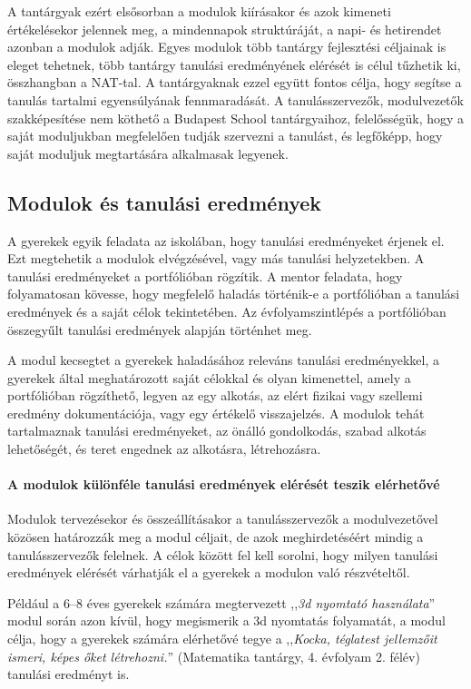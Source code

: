 A tantárgyak ezért elsősorban a modulok kiírásakor és azok kimeneti értékelésekor jelennek meg, a mindennapok struktúráját, a napi- és hetirendet azonban a modulok adják. Egyes modulok több tantárgy fejlesztési céljainak is eleget tehetnek, több tantárgy tanulási eredményének elérését is célul tűzhetik ki, összhangban a NAT-tal. A tantárgyaknak ezzel együtt fontos célja, hogy segítse a tanulás tartalmi egyensúlyának fennmaradását. A tanulásszervezők, modulvezetők szakképesítése nem köthető a Budapest School tantárgyaihoz, felelősségük, hogy a saját moduljukban megfelelően tudják szervezni a tanulást, és legfőképp, hogy saját moduljuk megtartására alkalmasak legyenek.

\subsection{Modulok és tanulási eredmények}
\label{sec:modulok_es_tanulasi_eredmenyek}
A gyerekek egyik feladata az iskolában, hogy tanulási eredményeket érjenek el. Ezt megtehetik a modulok elvégzésével, vagy más tanulási helyzetekben. A tanulási eredményeket a portfólióban rögzítik. A mentor feladata, hogy folyamatosan kövesse, hogy megfelelő haladás történik-e a portfólióban a tanulási eredmények és a saját célok tekintetében. Az évfolyamszintlépés a portfólióban összegyűlt tanulási eredmények alapján történhet meg.

A modul kecsegtet a gyerekek haladásához releváns tanulási eredményekkel, a gyerekek által meghatározott saját célokkal és olyan kimenettel, amely a portfólióban rögzíthető, legyen az egy alkotás, az elért fizikai vagy szellemi eredmény dokumentációja, vagy egy értékelő visszajelzés. A modulok tehát tartalmaznak tanulási eredményeket, az önálló gondolkodás, szabad alkotás lehetőségét, és teret engednek az alkotásra, létrehozásra.

\paragraph{A modulok különféle tanulási eredmények elérését teszik
  elérhetővé}\hfil\break
Modulok tervezésekor és összeállításakor a tanulásszervezők a modulvezetővel közösen határozzák meg a modul céljait, de azok meghirdetéséért mindig a tanulásszervezők felelnek. A célok között fel kell sorolni, hogy milyen tanulási eredmények elérését várhatják el a gyerekek a modulon való részvételtől.

Például a 6--8 éves gyerekek számára megtervezett ,,\emph{3d nyomtató használata}'' modul során azon kívül, hogy megismerik a 3d nyomtatás folyamatát, a modul célja, hogy a gyerekek számára elérhetővé tegye a ,,\emph{Kocka, téglatest jellemzőit ismeri, képes őket létrehozni.}'' (Matematika tantárgy, 4. évfolyam 2. félév) tanulási eredményt is.

